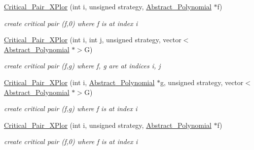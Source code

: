 \begin{Indent}
\begin{DoxyCompactItemize}
\mbox{\label{group___g_b_computation_ac1564546db9b4736444a614970c1796d}} 
\hyperlink{group___g_b_computation_ac1564546db9b4736444a614970c1796d}{Critical\+\_\+\+Pair\+\_\+\+X\+Plor} (int i, unsigned strategy, \hyperlink{group__polygroup_class_abstract___polynomial}{Abstract\+\_\+\+Polynomial} $\ast$f)
\begin{DoxyCompactList}\small\item\em create critical pair (f,0) where f is at index {\ttfamily i} \end{DoxyCompactList}\item 
\mbox{\label{group___g_b_computation_af5d0947e70b4070f796f1b0d8ce75484}} 
\hyperlink{group___g_b_computation_af5d0947e70b4070f796f1b0d8ce75484}{Critical\+\_\+\+Pair\+\_\+\+X\+Plor} (int i, int j, unsigned strategy, vector$<$ \hyperlink{group__polygroup_class_abstract___polynomial}{Abstract\+\_\+\+Polynomial} $\ast$$>$G)
\begin{DoxyCompactList}\small\item\em create critical pair (f,g) where f, g are at indices {\ttfamily i}, {\ttfamily j} \end{DoxyCompactList}\item 
\mbox{\label{group___g_b_computation_a1cafe8e84ec3bee5e63370b7b815ba71}} 
\hyperlink{group___g_b_computation_a1cafe8e84ec3bee5e63370b7b815ba71}{Critical\+\_\+\+Pair\+\_\+\+X\+Plor} (int i, \hyperlink{group__polygroup_class_abstract___polynomial}{Abstract\+\_\+\+Polynomial} $\ast$g, unsigned strategy, vector$<$ \hyperlink{group__polygroup_class_abstract___polynomial}{Abstract\+\_\+\+Polynomial} $\ast$$>$G)
\begin{DoxyCompactList}\small\item\em create critical pair (f,g) where f is at index {\ttfamily i} \end{DoxyCompactList}\item 
\mbox{\label{group___g_b_computation_ac1564546db9b4736444a614970c1796d}} 
\hyperlink{group___g_b_computation_ac1564546db9b4736444a614970c1796d}{Critical\+\_\+\+Pair\+\_\+\+X\+Plor} (int i, unsigned strategy, \hyperlink{group__polygroup_class_abstract___polynomial}{Abstract\+\_\+\+Polynomial} $\ast$f)
\begin{DoxyCompactList}\small\item\em create critical pair (f,0) where f is at index {\ttfamily i} \end{DoxyCompactList}\item 

\end{DoxyCompactItemize}
\end{Indent}
